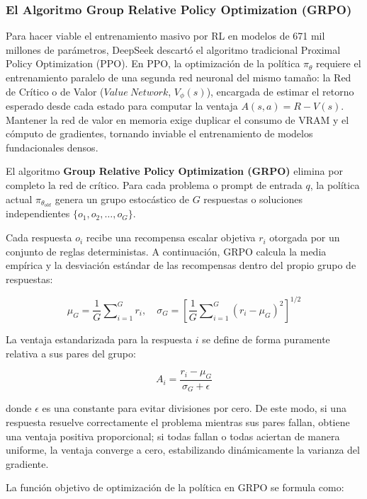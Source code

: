 \subsubsection{El Algoritmo Group Relative Policy Optimization (GRPO)}

Para hacer viable el entrenamiento masivo por RL en modelos de 671 mil millones de parámetros, DeepSeek descartó el algoritmo tradicional Proximal Policy Optimization (PPO). En PPO, la optimización de la política $\pi_\theta$ requiere el entrenamiento paralelo de una segunda red neuronal del mismo tamaño: la Red de Crítico o de Valor ($Value\ Network$, $V_\phi(s)$), encargada de estimar el retorno esperado desde cada estado para computar la ventaja $A(s, a) = R - V(s)$. Mantener la red de valor en memoria exige duplicar el consumo de VRAM y el cómputo de gradientes, tornando inviable el entrenamiento de modelos fundacionales densos.

El algoritmo \textbf{Group Relative Policy Optimization (GRPO)} elimina por completo la red de crítico. Para cada problema o prompt de entrada $q$, la política actual $\pi_{\theta_{old}}$ genera un grupo estocástico de $G$ respuestas o soluciones independientes $\{o_1, o_2, \dots, o_G\}$.

Cada respuesta $o_i$ recibe una recompensa escalar objetiva $r_i$ otorgada por un conjunto de reglas deterministas. A continuación, GRPO calcula la media empírica y la desviación estándar de las recompensas dentro del propio grupo de respuestas:

\begin{equation}
\mu_G = \frac{1}{G} \sum\nolimits_{i=1}^G r_i, \quad \sigma_G = \left[ \frac{1}{G} \sum\nolimits_{i=1}^G (r_i - \mu_G)^2 \right]^{1/2}
\end{equation}

La ventaja estandarizada para la respuesta $i$ se define de forma puramente relativa a sus pares del grupo:

\begin{equation}
A_i = \frac{r_i - \mu_G}{\sigma_G + \epsilon}
\end{equation}

donde $\epsilon$ es una constante para evitar divisiones por cero. De este modo, si una respuesta resuelve correctamente el problema mientras sus pares fallan, obtiene una ventaja positiva proporcional; si todas fallan o todas aciertan de manera uniforme, la ventaja converge a cero, estabilizando dinámicamente la varianza del gradiente.

La función objetivo de optimización de la política en GRPO se formula como:

